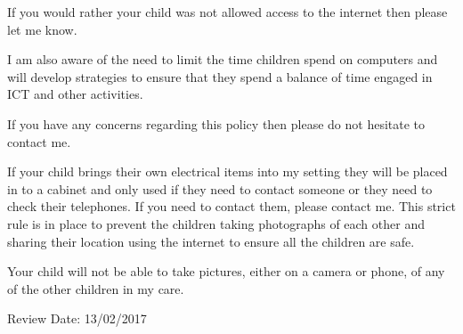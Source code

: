 If you would rather your child was not allowed access to the internet
then please let me know.

I am also aware of the need to limit the time children spend on
computers and will develop strategies to ensure that they spend a
balance of time engaged in ICT and other activities.

If you have any concerns regarding this policy then please do not
hesitate to contact me.

If your child brings their own electrical items into my setting they
will be placed in to a cabinet and only used if they need to contact
someone or they need to check their telephones. If you need to contact
them, please contact me. This strict rule is in place to prevent the
children taking photographs of each other and sharing their location
using the internet to ensure all the children are safe.

Your child will not be able to take pictures, either on a camera or
phone, of any of the other children in my care.

Review Date: 13/02/2017


